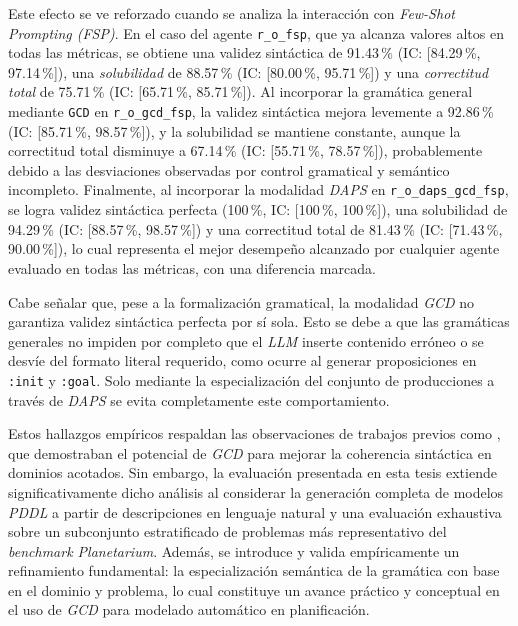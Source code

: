 Este efecto se ve reforzado cuando se analiza la interacción con \textit{Few-Shot Prompting (FSP)}. En el caso del agente \texttt{r\_o\_fsp}, que ya alcanza valores altos en todas las métricas, se obtiene una validez sintáctica de 91.43\,\% (IC: [84.29\,\%, 97.14\,\%]), una \textit{solubilidad} de 88.57\,\% (IC: [80.00\,\%, 95.71\,\%]) y una \textit{correctitud total} de 75.71\,\% (IC: [65.71\,\%, 85.71\,\%]). Al incorporar la gramática general mediante \texttt{GCD} en \texttt{r\_o\_gcd\_fsp}, la validez sintáctica mejora levemente a 92.86\,\% (IC: [85.71\,\%, 98.57\,\%]), y la solubilidad se mantiene constante, aunque la correctitud total disminuye a 67.14\,\% (IC: [55.71\,\%, 78.57\,\%]), probablemente debido a las desviaciones observadas por control gramatical y semántico incompleto. Finalmente, al incorporar la modalidad \textit{DAPS} en \texttt{r\_o\_daps\_gcd\_fsp}, se logra validez sintáctica perfecta (100\,\%, IC: [100\,\%, 100\,\%]), una solubilidad de 94.29\,\% (IC: [88.57\,\%, 98.57\,\%]) y una correctitud total de 81.43\,\% (IC: [71.43\,\%, 90.00\,\%]), lo cual representa el mejor desempeño alcanzado por cualquier agente evaluado en todas las métricas, con una diferencia marcada.

Cabe señalar que, pese a la formalización gramatical, la modalidad \textit{GCD} no garantiza validez sintáctica perfecta por sí sola. Esto se debe a que las gramáticas generales no impiden por completo que el \textit{LLM} inserte contenido erróneo o se desvíe del formato literal requerido, como ocurre al generar proposiciones en \texttt{:init} y \texttt{:goal}. Solo mediante la especialización del conjunto de producciones a través de \textit{DAPS} se evita completamente este comportamiento.

Estos hallazgos empíricos respaldan las observaciones de trabajos previos como \parencite{loula2025syntactic}, que demostraban el potencial de \textit{GCD} para mejorar la coherencia sintáctica en dominios acotados. Sin embargo, la evaluación presentada en esta tesis extiende significativamente dicho análisis al considerar la generación completa de modelos \textit{PDDL} a partir de descripciones en lenguaje natural y una evaluación exhaustiva sobre un subconjunto estratificado de problemas más representativo del \textit{benchmark Planetarium}. Además, se introduce y valida empíricamente un refinamiento fundamental: la especialización semántica de la gramática con base en el dominio y problema, lo cual constituye un avance práctico y conceptual en el uso de \textit{GCD} para modelado automático en planificación.

